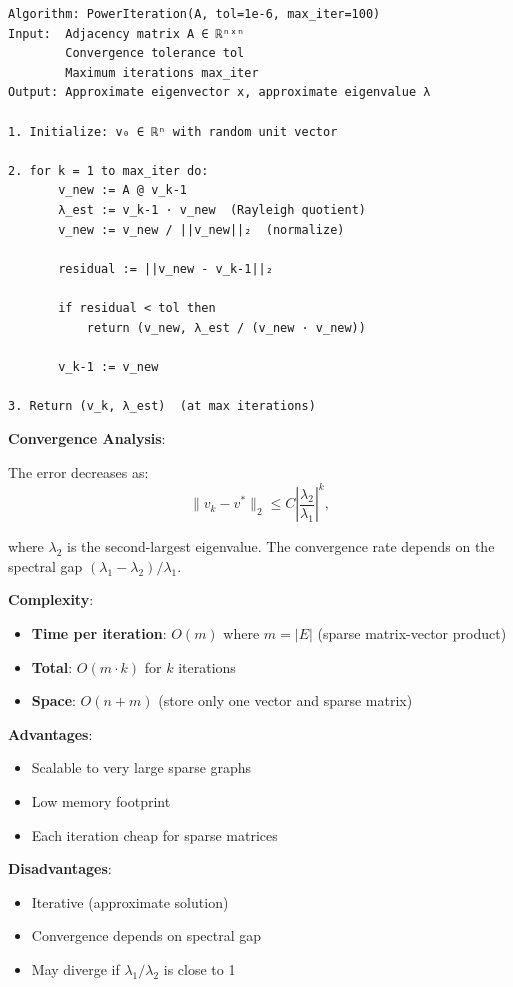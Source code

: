 \documentclass[12pt]{article}
\begin{document}
\begin{lstlisting}
Algorithm: PowerIteration(A, tol=1e-6, max_iter=100)
Input:  Adjacency matrix A ∈ ℝⁿˣⁿ
        Convergence tolerance tol
        Maximum iterations max_iter
Output: Approximate eigenvector x, approximate eigenvalue λ

1. Initialize: v₀ ∈ ℝⁿ with random unit vector

2. for k = 1 to max_iter do:
       v_new := A @ v_k-1
       λ_est := v_k-1 · v_new  (Rayleigh quotient)
       v_new := v_new / ||v_new||₂  (normalize)
       
       residual := ||v_new - v_k-1||₂
       
       if residual < tol then
           return (v_new, λ_est / (v_new · v_new))
       
       v_k-1 := v_new

3. Return (v_k, λ_est)  (at max iterations)
\end{lstlisting}

\textbf{Convergence Analysis}:

The error decreases as:
\[
\|v_k - v^*\|_2 \leq C \left| \frac{\lambda_2}{\lambda_1} \right|^k,
\]

where $\lambda_2$ is the second-largest eigenvalue. The convergence rate depends on the spectral gap $(\lambda_1 - \lambda_2) / \lambda_1$.

\textbf{Complexity}:
\begin{itemize}
    \item \textbf{Time per iteration}: $O(m)$ where $m = |E|$ (sparse matrix-vector product)
    \item \textbf{Total}: $O(m \cdot k)$ for $k$ iterations
    \item \textbf{Space}: $O(n + m)$ (store only one vector and sparse matrix)
\end{itemize}

\textbf{Advantages}:
\begin{itemize}
    \item Scalable to very large sparse graphs
    \item Low memory footprint
    \item Each iteration cheap for sparse matrices
\end{itemize}

\textbf{Disadvantages}:
\begin{itemize}
    \item Iterative (approximate solution)
    \item Convergence depends on spectral gap
    \item May diverge if $\lambda_1 / \lambda_2$ is close to 1
\end{itemize}
\end{document}
